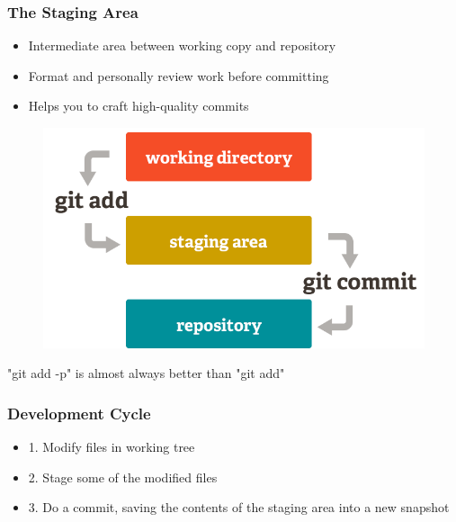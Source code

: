 \documentclass{beamer}
\begin{document}
\begin{frame}
	\frametitle{The Staging Area}
	\begin{itemize}
		\item{Intermediate area between working copy and repository}
		\item{Format and personally review work before committing}
		\item{Helps you to craft high-quality commits}
	\end{itemize}
	\begin{figure}
		\includegraphics[scale=0.3]{stagingarea.png}
	\end{figure}
	\begin{tcolorbox}[colback=green!5,colframe=green!40!black,title=Pro Tip] "git add -p" is almost always better than "git add"
	\end{tcolorbox}
\end{frame}

\begin{frame}
	\frametitle{Development Cycle}
	\begin{itemize}
		\item{1. Modify files in working tree}
		\item{2. Stage some of the modified files}
		\item{3. Do a commit, saving the contents of the staging area into a new snapshot}
	\end{itemize}
\end{frame}
\end{document}
